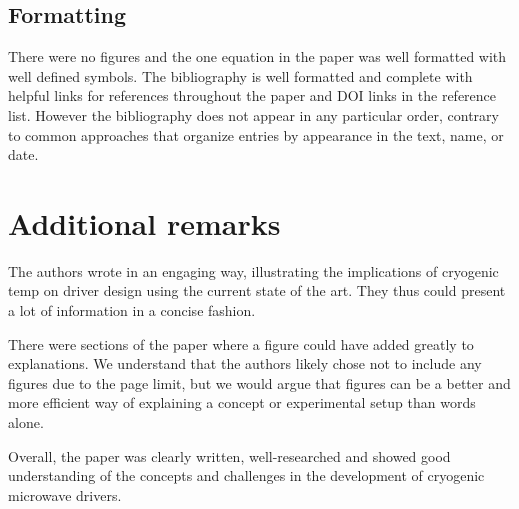 \documentclass[11pt]{article}
\begin{document}
\subsection{Formatting}

There were no figures and the one equation in the paper was
well formatted with well defined symbols. The bibliography is well
formatted and complete with helpful links for references throughout
the paper and DOI links in the reference list. However the
bibliography does not appear in any particular order, contrary to
common approaches that organize entries by appearance in the text,
name, or date.

\section{Additional remarks}

The authors wrote in an engaging way, illustrating the implications of cryogenic
temp on driver design using the current state of the art. They thus could
present a lot of information in a concise fashion.

There were sections of the paper where a figure could have
added greatly to explanations. We understand that the authors likely
chose not to include any figures due to the page limit, but we would
argue that figures can be a better and more efficient way of
explaining a concept or experimental setup than words alone.

Overall, the paper was clearly written, well-researched and showed
good understanding of the concepts and challenges in the development
of cryogenic microwave drivers.
\end{document}
